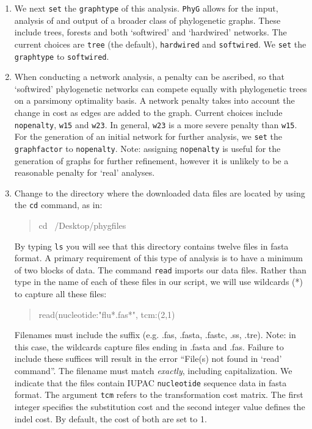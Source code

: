 \documentclass[11pt]{article}
\newcommand{\phyg}{\texttt{PhyG} }
\begin{document}
\begin{enumerate}
\item We next \texttt{set} the \texttt{graphtype} of this analysis. \phyg allows for 
the input, analysis of and output of a broader class of phylogenetic graphs. These
include trees, forests and both `softwired' and `hardwired' networks. The current 
choices are \texttt{tree} (the default), \texttt{hardwired} and \texttt{softwired}. We 
\texttt{set} the \texttt{graphtype} to \texttt{softwired}.

\item When conducting a network analysis, a penalty can be ascribed, so that 
`softwired' phylogenetic networks can compete equally with phylogenetic trees on 
a parsimony optimality basis. A network penalty takes into account the change in 
cost as edges are added to the graph. Current choices include \texttt{nopenalty}, 
\texttt{w15} and \texttt{w23}. In general, \texttt{w23} is a more severe penalty than
\texttt{w15}. For the generation of an initial network for further analysis, we \texttt{set} 
the \texttt{graphfactor} to \texttt{nopenalty}. Note: assigning \texttt{nopenalty}
is useful for the generation of graphs for further refinement, however it is unlikely 
to be a reasonable penalty for `real' analyses.

\item Change to the directory where the downloaded data files are located by using 
the \texttt{cd} command, as in:
		
	\begin{quote}
	cd ~/Desktop/phygfiles
	\end{quote}

By typing \texttt{ls} you will see that this directory contains twelve files in fasta format.
A primary requirement of this type of analysis is to have a minimum of two blocks of 
data. The command \texttt{read} imports our data files. Rather than type in the name 
of each of these files in our script, we will use wildcards (*) to capture all these files: 
        
        \begin{quote}
	read(nucleotide:"flu*.fas*", tcm:(2,1)\\
	\end{quote}

Filenames must include the suffix (e.g. .fas, .fasta, .fastc, .ss, .tre). Note: in this case, 
the wildcards capture files ending in .fasta and .fas. Failure to include these suffices 
will result in the error ``File(s) not found in `read' command''. The filename must match 
\textit{exactly}, including capitalization. We indicate that the files contain IUPAC 
\texttt{nucleotide} sequence data in fasta format. The argument \texttt{tcm} refers to 
the transformation cost matrix. The first integer specifies the substitution cost and the 
second integer value defines the indel cost. By default, the cost of both are set to 1.


\end{enumerate}
\end{document}
